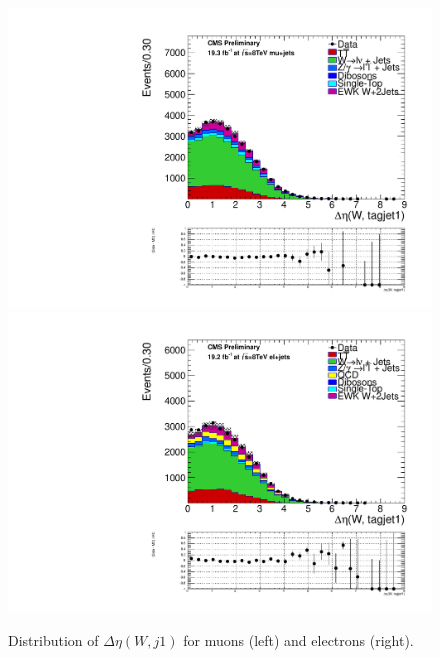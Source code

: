 \begin{figure}[ht]
\centerline{
      \includegraphics[width=.49\textwidth]{figs/n-1_plots_mu/mu_EWK_W_2jets_W_tagjet1_deltaeta_mjj_600_tagjet1_60_tagjet2_50_Zeppenfield_1point2_EWKW2jets.pdf}
      \includegraphics[width=.49\textwidth]{figs/n-1_plots_el/el_EWK_W_2jets_W_tagjet1_deltaeta_mjj_600_tagjet1_60_tagjet2_50_Zeppenfield_1point2_met_30_WmT_30_EWKW2jets.pdf}
}
\caption{Distribution of $\Delta \eta(W,j1)$ for muons (left) and electrons (right).}
\label{fig:deltaetawj1}
\end{figure}
%
%

